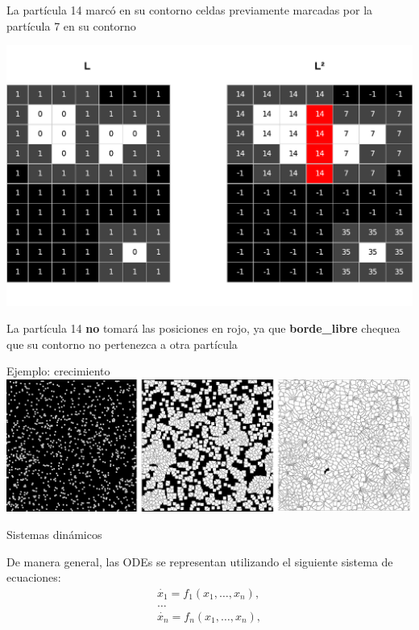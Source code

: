 \documentclass[spanish]{beamer}
\begin{document}
\begin{frame}
La partícula 14 marcó en su contorno celdas previamente marcadas por la partícula 7 en su contorno
\centerline{\includegraphics[scale = 0.45]{../figures/sistemaparticulas}}
La partícula 14 \textbf{no} tomará las posiciones en rojo, ya que \textbf{borde\_libre} chequea que su contorno no pertenezca a otra partícula
\end{frame}

\begin{frame}{Ejemplo: crecimiento}
\includegraphics[scale = 0.15]{../figures/modeladocrec}
\end{frame}


\begin{frame}{Sistemas dinámicos}

De manera general, las ODEs se representan utilizando el siguiente sistema de ecuaciones:
\begin{equation*}
  \begin{aligned}
    \dot{x_{1}} = f_{1}(x_{1},\ldots,x_{n}),\\
    \ldots\\
    \dot{x_{n}} = f_{n}(x_{1},\ldots,x_{n}),
  \end{aligned}
\end{equation*}



\end{frame}
\end{document}

